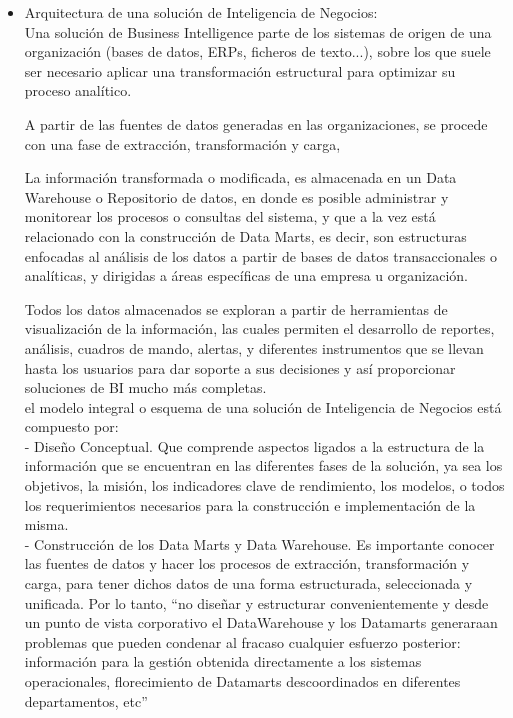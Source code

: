 \documentclass[twoside,twocolumn]{article}
\begin{document}
\begin{itemize}
\item Arquitectura de una solución de Inteligencia de Negocios: \\

Una solución de Business Intelligence parte de los sistemas de origen de una organización
(bases de datos, ERPs, ficheros de texto...), sobre los que suele ser necesario
aplicar una transformación estructural para optimizar su proceso analítico.

A partir de las fuentes de datos generadas en las organizaciones, se procede con
una fase de extracción, transformación y carga,

La información transformada o modificada, es almacenada en un Data Warehouse
o Repositorio de datos, en donde es posible administrar y monitorear los procesos
o consultas del sistema, y que a la vez está relacionado con la construcción de
Data Marts, es decir, son estructuras enfocadas al análisis de los datos a partir de
bases de datos transaccionales o analíticas, y dirigidas a áreas específicas de una
empresa u organización. 

Todos los datos almacenados se exploran a partir de herramientas de
visualización de la información, las cuales permiten el desarrollo de reportes,
análisis, cuadros de mando, alertas, y diferentes instrumentos que se llevan hasta
los usuarios para dar soporte a sus decisiones y así proporcionar soluciones de BI
mucho más completas.\\

el modelo integral o esquema de una solución de
Inteligencia de Negocios está compuesto por: \\

- Diseño Conceptual. Que comprende aspectos ligados a la estructura de la
información que se encuentran en las diferentes fases de la solución, ya sea los
objetivos, la misión, los indicadores clave de rendimiento, los modelos, o todos los
requerimientos necesarios para la construcción e implementación de la misma. \\

- Construcción de los Data Marts y Data Warehouse. Es importante
conocer las fuentes de datos y hacer los procesos de extracción, transformación y
carga, para tener dichos datos de una forma estructurada, seleccionada y
unificada. Por lo tanto, “no diseñar y estructurar convenientemente y desde un
punto de vista corporativo el DataWarehouse y los Datamarts generaraan problemas
que pueden condenar al fracaso cualquier esfuerzo posterior: información para la
gestión obtenida directamente a los sistemas operacionales, florecimiento de
Datamarts descoordinados en diferentes departamentos, etc”  \\


\end{itemize}
\end{document}
